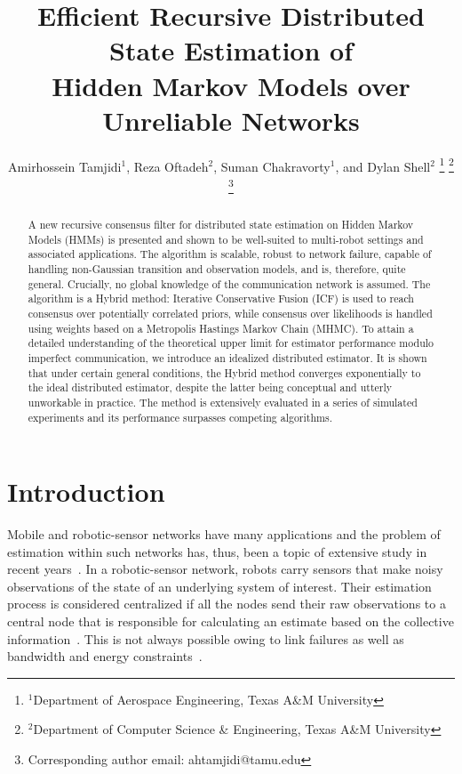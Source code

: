 \documentclass[journal]{IEEEtran}
\title{\LARGE \bf Efficient Recursive Distributed State Estimation of\\ Hidden Markov Models over Unreliable
Networks}
\author {Amirhossein Tamjidi$^{1}$, Reza Oftadeh$^{2}$, Suman Chakravorty$^{1}$, and Dylan Shell$^{2}$
\thanks{$^{1}$Department of Aerospace Engineering, Texas A\&M University}
\thanks{$^{2}$Department of Computer Science \& Engineering, Texas A\&M University}
\thanks{Corresponding author email: ahtamjidi@tamu.edu}}
\theoremstyle{remark}
\theoremstyle{definition}
\begin{document}
\maketitle

\begin{abstract}
A new recursive consensus filter for distributed state estimation on Hidden
Markov Models (HMMs) is presented and shown to be well-suited to multi-robot
settings and associated applications.  The algorithm is scalable, robust to
network failure, capable of handling non-Gaussian transition and observation
models, and is, therefore, quite general.  Crucially, no global knowledge of
the communication network is assumed.  The algorithm is a Hybrid method:
Iterative Conservative Fusion (ICF) is used to reach consensus over potentially
correlated priors, while consensus over likelihoods is handled using weights
based on a Metropolis Hastings Markov Chain (MHMC).  To attain a detailed
understanding of the theoretical upper limit for estimator performance modulo
imperfect communication, we introduce an idealized distributed estimator.  It
is shown that under certain general conditions, the Hybrid method converges
exponentially to the ideal distributed estimator, despite the latter being
conceptual and utterly unworkable in practice.  The method is extensively
evaluated in a series of simulated experiments and its performance surpasses
competing algorithms.
\end{abstract}

\section{Introduction}
Mobile and robotic-sensor networks have many applications and the problem of
estimation within such networks has, thus, been a topic of extensive study in
recent
years~\cite{durrant2001data,campbell2016distributed,boem2015decentralized}.  In
a robotic-sensor network, robots carry sensors that make noisy observations of
the state of an underlying system of interest. Their estimation process is
considered centralized if all the nodes send their raw observations to a
central node that is responsible for calculating an estimate based on the
collective information~\cite{ahmed201522}. This is not always possible owing to
link failures as well as bandwidth and energy
constraints~\cite{Zhang_ttradeof1}. 
\end{document}
